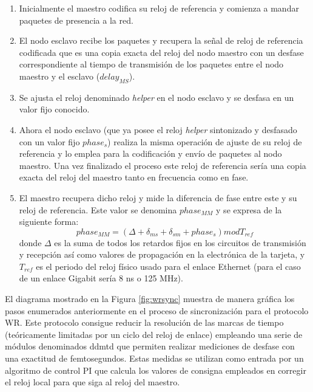 \begin{enumerate}
	\item Inicialmente el maestro codifica su reloj de referencia y comienza a 
	mandar paquetes de presencia a la red.
	
	\item El nodo esclavo recibe los paquetes y recupera la señal de reloj de 
	referencia codificada que es una copia exacta del reloj del nodo maestro 
	con un desfase correspondiente al tiempo de transmisión de los paquetes 
	entre el nodo maestro y el esclavo ($delay_{MS}$).
	
	\item Se ajusta el reloj denominado \textit{helper} en el nodo esclavo y se 
	desfasa en un valor fijo conocido.
	
	\item Ahora el nodo esclavo (que ya posee el reloj \textit{helper} 
	sintonizado y desfasado con un valor fijo $phase_s$) realiza la misma 
	operación de ajuste de su reloj de referencia y lo emplea para la 
	codificación y envío de paquetes al nodo maestro. Una vez finalizado el 
	proceso este reloj de referencia sería una copia exacta del reloj del 
	maestro tanto en frecuencia como en fase.
	
	\item El maestro recupera dicho reloj y mide la diferencia de fase entre 
	este y su reloj de referencia. Este valor se denomina $phase_{MM}$ y se 
	expresa de la siguiente forma:
	\begin{equation}\label{eq:phasemm}
	phase_{MM} = (\Delta + \delta_{ms} + \delta_{sm} + phase_s) mod T_{ref}
	\end{equation}
	donde $\Delta$ es la suma de todos los retardos fijos en los circuitos de 
	transmisión y recepción así como valores de propagación en la electrónica 
	de la tarjeta, y $T_{ref}$ es el periodo del reloj físico usado para el 
	enlace Ethernet (para el caso de un enlace Gigabit sería 8 ns o 125 MHz).
\end{enumerate}

El diagrama mostrado en la Figura \ref{fig:wrsync} muestra de manera gráfica 
los pasos enumerados anteriormente en el proceso de sincronización para el 
protocolo WR. Este protocolo consigue reducir la resolución de las marcas de 
tiempo (teóricamente limitadas por un ciclo del reloj de enlace) empleando una 
serie de módulos denominados \gls{ddmtd} que permiten realizar mediciones de 
desfase con una exactitud de femtosegundos. Estas medidas se utilizan como 
entrada por un algoritmo de control PI que calcula los valores de consigna 
empleados en corregir el reloj local para que siga al reloj del maestro.

